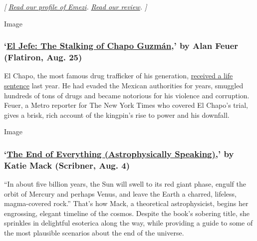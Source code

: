 \emph{{[}}
\href{https://www.nytimes3xbfgragh.onion/2019/09/09/books/akwaeke-emezi-pet-freshwater.html}{\emph{Read
our profile of Emezi}}\emph{. \textbar{}}
\href{https://www.nytimes3xbfgragh.onion/2020/07/28/books/death-vivek-oji-akwaeke-emezi-group-text.html}{\emph{Read
our review}}\emph{. {]}}

Image

\hypertarget{el-jefe-the-stalking-of-chapo-guzmuxe1n-by-alan-feuer-flatiron-aug-25}{%
\subsubsection{\texorpdfstring{`\href{https://us.macmillan.com/books/9781250254528}{El
Jefe: The Stalking of Chapo Guzmán},' by Alan Feuer (Flatiron, Aug.
25)}{`El Jefe: The Stalking of Chapo Guzmán,' by Alan Feuer (Flatiron, Aug. 25)}}\label{el-jefe-the-stalking-of-chapo-guzmuxe1n-by-alan-feuer-flatiron-aug-25}}

El Chapo, the most famous drug trafficker of his generation,
\href{https://www.nytimes3xbfgragh.onion/2019/07/17/nyregion/el-chapo-sentencing.html}{received
a life sentence} last year. He had evaded the Mexican authorities for
years, smuggled hundreds of tons of drugs and became notorious for his
violence and corruption. Feuer, a Metro reporter for The New York Times
who covered El Chapo's trial, gives a brisk, rich account of the
kingpin's rise to power and his downfall.

Image

\hypertarget{the-end-of-everything-astrophysically-speaking-by-katie-mack-scribner-aug-4}{%
\subsubsection{\texorpdfstring{`\href{https://www.simonandschuster.com/books/The-End-of-Everything/Katie-Mack/9781982103545}{The
End of Everything (Astrophysically Speaking)},' by Katie Mack (Scribner,
Aug.
4)}{`The End of Everything (Astrophysically Speaking),' by Katie Mack (Scribner, Aug. 4)}}\label{the-end-of-everything-astrophysically-speaking-by-katie-mack-scribner-aug-4}}

``In about five billion years, the Sun will swell to its red giant
phase, engulf the orbit of Mercury and perhaps Venus, and leave the
Earth a charred, lifeless, magma-covered rock.'' That's how Mack, a
theoretical astrophysicist, begins her engrossing, elegant timeline of
the cosmos. Despite the book's sobering title, she sprinkles in
delightful esoterica along the way, while providing a guide to some of
the most plausible scenarios about the end of the universe.

